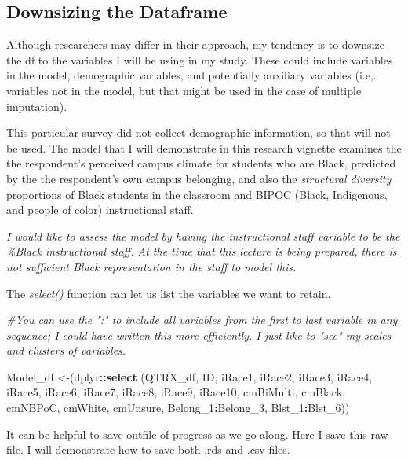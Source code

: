 \documentclass[
  11pt,
]{book}
\newenvironment{Shaded}{\begin{snugshade}}{\end{snugshade}}
\newcommand{\CommentTok}[1]{\textcolor[rgb]{0.37,0.37,0.37}{\textit{#1}}}
\newcommand{\FunctionTok}[1]{\textcolor[rgb]{0.27,0.27,0.27}{\textbf{#1}}}
\newcommand{\NormalTok}[1]{#1}
\newcommand{\OtherTok}[1]{\textcolor[rgb]{0.37,0.37,0.37}{#1}}
\newcommand{\SpecialCharTok}[1]{\textcolor[rgb]{0.43,0.43,0.43}{\textbf{#1}}}
\begin{document}
\hypertarget{downsizing-the-dataframe}{%
\subsection{Downsizing the Dataframe}\label{downsizing-the-dataframe}}

Although researchers may differ in their approach, my tendency is to downsize the df to the variables I will be using in my study. These could include variables in the model, demographic variables, and potentially auxiliary variables (i.e,. variables not in the model, but that might be used in the case of multiple imputation).

This particular survey did not collect demographic information, so that will not be used. The model that I will demonstrate in this research vignette examines the the respondent's perceived campus climate for students who are Black, predicted by the the respondent's own campus belonging, and also the \emph{structural diversity} \citep{lewis_black_2019} proportions of Black students in the classroom and BIPOC (Black, Indigenous, and people of color) instructional staff.

\emph{I would like to assess the model by having the instructional staff variable to be the \%Black instructional staff. At the time that this lecture is being prepared, there is not sufficient Black representation in the staff to model this.}

The \emph{select()} function can let us list the variables we want to retain.

\begin{Shaded}
\begin{Highlighting}[]
\CommentTok{\#You can use the ":" to include all variables from the first to last variable in any sequence; I could have written this more efficiently.  I just like to "see" my scales and clusters of variables.}

\NormalTok{Model\_df }\OtherTok{\textless{}{-}}\NormalTok{(dplyr}\SpecialCharTok{::}\FunctionTok{select}\NormalTok{ (QTRX\_df, ID, iRace1, iRace2, iRace3, iRace4, iRace5, iRace6, iRace7, iRace8, iRace9, iRace10, cmBiMulti, cmBlack, cmNBPoC, cmWhite, cmUnsure, Belong\_1}\SpecialCharTok{:}\NormalTok{Belong\_3, Blst\_1}\SpecialCharTok{:}\NormalTok{Blst\_6))}
\end{Highlighting}
\end{Shaded}

It can be helpful to save outfile of progress as we go along. Here I save this raw file. I will demonstrate how to save both .rds and .csv files.
\end{document}
